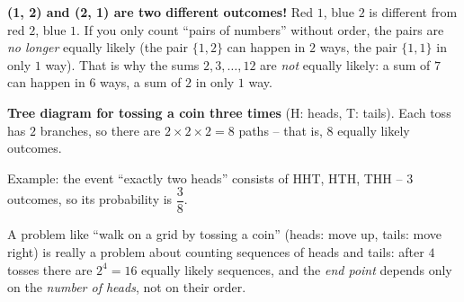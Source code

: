 \documentclass[11pt]{article}
\begin{document}
\begin{warnbox}
\textbf{(1, 2) and (2, 1) are two different outcomes!} Red $1$, blue $2$ is different from red $2$, blue $1$. If you only count ``pairs of numbers'' without order, the pairs are \emph{no longer} equally likely (the pair $\{1,2\}$ can happen in $2$ ways, the pair $\{1,1\}$ in only $1$ way). That is why the sums $2,3,\dots,12$ are \emph{not} equally likely: a sum of $7$ can happen in $6$ ways, a sum of $2$ in only $1$ way.
\end{warnbox}

\textbf{Tree diagram for tossing a coin three times} (H: heads, T: tails). Each toss has $2$ branches, so there are $2\times2\times2=8$ paths -- that is, $8$ equally likely outcomes.
\begin{center}\end{center}
Example: the event ``exactly two heads'' consists of HHT, HTH, THH -- $3$ outcomes, so its probability is $\dfrac38$.

\begin{tipbox}
A problem like ``walk on a grid by tossing a coin'' (heads: move up, tails: move right) is really a problem about counting sequences of heads and tails: after $4$ tosses there are $2^4=16$ equally likely sequences, and the \emph{end point} depends only on the \emph{number of heads}, not on their order.
\end{tipbox}
\end{document}
